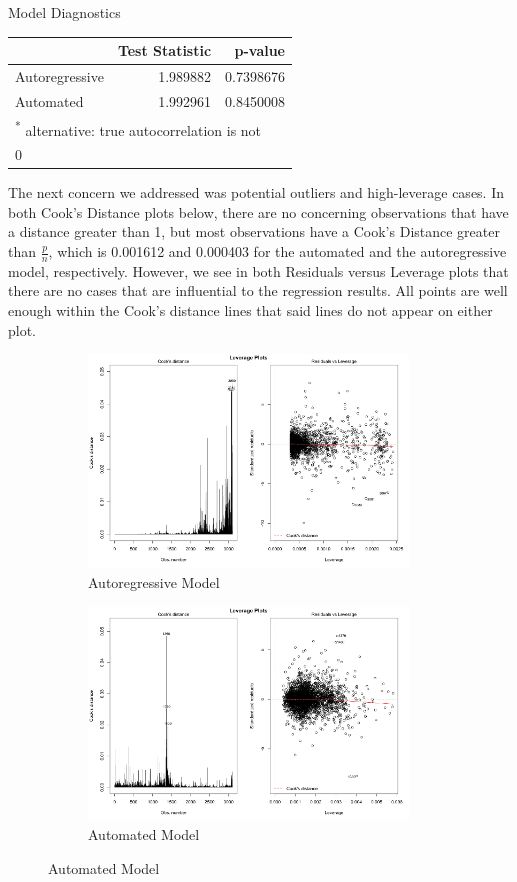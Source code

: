 \documentclass[]{article}
\begin{document}
\begin{section}{Model Diagnostics}
\begin{table}[H]
\centering
\begin{tabular}{l|r|r}
\hline
  & Test Statistic & p-value\\
\hline
Autoregressive & 1.989882 & 0.7398676\\
\hline
Automated & 1.992961 & 0.8450008\\
\hline
\multicolumn{3}{l}{\textsuperscript{*} alternative: true autocorrelation is not}\\
\multicolumn{3}{l}{0}\\
\end{tabular}
\end{table}

The next concern we addressed was potential outliers and high-leverage cases. In both Cook's Distance plots below, there are no concerning observations that have a distance greater than 1, but most observations have a Cook's Distance greater than $\frac{p}{n}$, which is 0.001612 and 0.000403 for the automated and the autoregressive model, respectively. However, we see in both Residuals versus Leverage plots that there are no cases that are influential to the regression results. All points are well enough within the Cook's distance lines that said lines do not appear on either plot.

\begin{figure}[H]
\begin{subfigure}{.5\textwidth}
  \includegraphics[width=85mm]{diagnostics/arm_leverage_plots.png}
  \caption{Autoregressive Model}
\end{subfigure}%
\begin{subfigure}{.5\textwidth}
  \includegraphics[width=85mm]{diagnostics/fm_leverage_plots.png}
  \caption{Automated Model}
\end{subfigure}
\end{figure}




\end{section}
\end{document}
